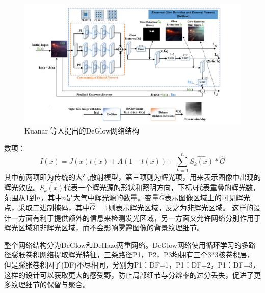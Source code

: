\begin{figure}[H]
\centering
\includegraphics[width=0.9\linewidth]{pics/screenshot004}
\caption{Kuanar 等人提出的DeGlow网络结构}
\label{fig:screenshot004}
\end{figure}
\begin{multicols}{2}
\noindent 数项：
\begin{equation}
	I(x)=J(x)t(x)+A(1-t(x))+\sum_{k=1}^{n}\hat{S_k(x)}*\hat{G}
\end{equation}
其中前两项即为传统的大气散射模型，第三项则为辉光项，用来表示图像中出现的辉光效应。$\hat{S_k(x)}$代表一个辉光源的形状和照明方向，下标$k$代表重叠的辉光数，范围从1到$n$，其中$n$是大气中辉光源的数量。变量$\hat{G}$表示图像区域上的可见辉光点，采取二进制掩码，其中$\hat{G}=1$则表示辉光区域，反之为非辉光区域。
这样的设计一方面有利于提供额外的信息来检测发光区域，另一方面又允许网络分别作用于辉光区域和非辉光区域，而不会影响雾霾图像的背景纹理细节。

整个网络结构分为DeGlow和DeHaze两重网络。DeGlow网络使用循环学习的多路径膨胀卷积网络提取辉光特征，三条路径P1，P2，P3均拥有三个3*3核卷积层，但是膨胀卷积因子(DF)不尽相同，分别为P1：DF=1，P1：DF=2，P1：DF=3，这样的设计可以获取更大的感受野，防止局部细节与分辨率的过分丢失，促进了更多纹理细节的保留与聚合。

\end{multicols}

